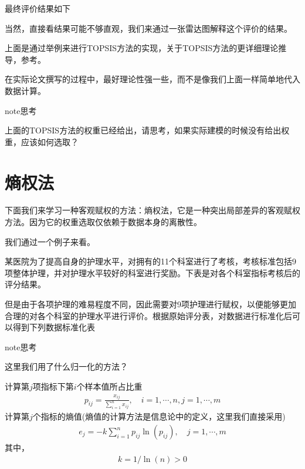 \documentclass[letterpaper,10pt,english]{sphinxmanual}
\begin{document}
最终评价结果如下


当然，直接看结果可能不够直观，我们来通过一张雷达图解释这个评价的结果。

上面是通过举例来进行TOPSIS方法的实现，关于TOPSIS方法的更详细理论推导，参考。

在实际论文撰写的过程中，最好理论性强一些，而不是像我们上面一样简单地代入数据计算。

\begin{sphinxadmonition}{note}{思考}

上面的TOPSIS方法的权重已经给出，请思考，如果实际建模的时候没有给出权重，应该如何选取？
\end{sphinxadmonition}


\section{熵权法}
\label{\detokenize{docs/evaluation_model:id18}}
下面我们来学习一种客观赋权的方法：熵权法，它是一种突出局部差异的客观赋权方法。因为它的权重选取仅依赖于数据本身的离散性。

我们通过一个例子来看。

某医院为了提高自身的护理水平，对拥有的11个科室进行了考核，考核标准包括9项整体护理，并对护理水平较好的科室进行奖励。下表是对各个科室指标考核后的评分结果。


但是由于各项护理的难易程度不同，因此需要对9项护理进行赋权，以便能够更加合理的对各个科室的护理水平进行评价。根据原始评分表，对数据进行标准化后可以得到下列数据标准化表


\begin{sphinxadmonition}{note}{思考}

这里我们用了什么归一化的方法？
\end{sphinxadmonition}

计算第\(j\)项指标下第\(i\)个样本值所占比重
\begin{equation*}
\begin{split}
p_{i j}=\frac{x_{i j}}{\displaystyle \sum_{i=1}^{n} x_{i j}}, \quad i=1, \cdots, n, j=1, \cdots, m
\end{split}
\end{equation*}
计算第\(j\)个指标的熵值(熵值的计算方法是信息论中的定义，这里我们直接采用)
\begin{equation*}
\begin{split}
e_{j}=-k \sum_{i=1}^{n} p_{i j} \ln \left(p_{i j}\right), \quad j=1, \cdots, m
\end{split}
\end{equation*}
其中，
\begin{equation*}
\begin{split}
k=1 / \ln (n)>0
\end{split}
\end{equation*}
\end{document}
